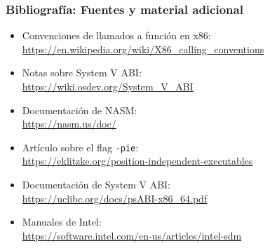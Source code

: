 \documentclass[aspectratio=169]{beamer}
\begin{document}
% 
% 
% 
% 
% 

\begin{frame}[fragile]
    \frametitle{Bibliografía: Fuentes y material adicional}
    \begin{itemize}
    \item Convenciones de llamados a función en x86: \\
    \url{https://en.wikipedia.org/wiki/X86_calling_conventions}
    \item Notas sobre System V ABI: \\
    \url{https://wiki.osdev.org/System_V_ABI}
    \item Documentación de NASM: \\
    \url{https://nasm.us/doc/}
    \item Artículo sobre el flag \texttt{-pie}: \\
    \url{https://eklitzke.org/position-independent-executables}
    \item Documentación de System V ABI: \\
    \url{https://uclibc.org/docs/psABI-x86_64.pdf}
    \item Manuales de Intel: \\
    \url{https://software.intel.com/en-us/articles/intel-sdm}
    \end{itemize}
\end{frame}
\end{document}
